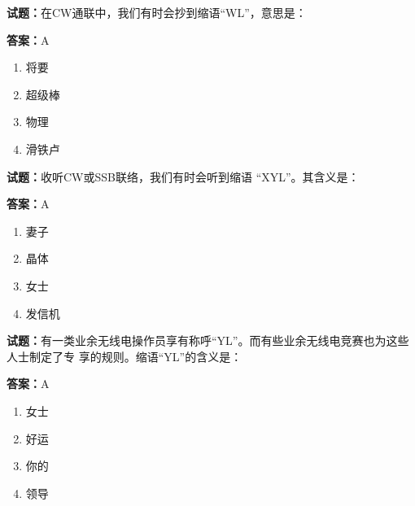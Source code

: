 \documentclass{ctexbook}
\begin{document}





\vspace{1em}

\textbf{试题：}在CW通联中，我们有时会抄到缩语“WL”，意思是： 

\textbf{答案：}A 

\begin{enumerate}[leftmargin=3em]
  \item 将要 

  \item 超级棒 

  \item 物理 

  \item 滑铁卢 

\end{enumerate}





\vspace{1em}

\textbf{试题：}收听CW或SSB联络，我们有时会听到缩语 “XYL”。其含义是： 

\textbf{答案：}A 

\begin{enumerate}[leftmargin=3em]
  \item 妻子 

  \item 晶体 

  \item 女士 

  \item 发信机 

\end{enumerate}





\vspace{1em}

\textbf{试题：}有一类业余无线电操作员享有称呼“YL”。而有些业余无线电竞赛也为这些人士制定了专
享的规则。缩语“YL”的含义是： 

\textbf{答案：}A 

\begin{enumerate}[leftmargin=3em]
  \item 女士 

  \item 好运 

  \item 你的 

  \item 领导 

\end{enumerate}
\end{document}
